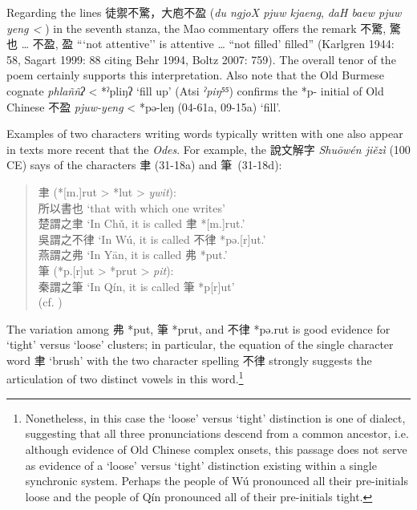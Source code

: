 Regarding the lines 徒禦不驚，大庖不盈 (\emph{du ngjoX pjuw kjaeng},
 \emph{daH baew pjuw yeng \textless{}} {}) in the seventh stanza, the Mao commentary offers the remark
不驚, 驚也 \ldots{} 不盈, 盈 ```not attentive'' is attentive \ldots{}
``not filled' filled'' (Karlgren 1944: 58, Sagart 1999: 88 citing Behr
1994, Boltz 2007: 759). The overall tenor of the poem certainly supports
this interpretation. Also note that the Old Burmese cognate 
{} \emph{phlaññʔ} \textless{} *ˀpliŋʔ `fill up' (Atsi  \emph{ˀpiŋ⁵⁵})
confirms the *p- initial of Old Chinese 不盈  \emph{pjuw-yeng}
\textless{} *pə-leŋ (04-61a, 09-15a) `fill'.

Examples of two characters writing words typically written with one also
appear in texts more recent that the \emph{Odes}. For example, the
說文解字 \emph{Shuōwén jiězì} (100 CE) says of the characters 聿
(31-18a) and 筆~(31-18d):

\begin{quote}
聿 (*[m.]rut \textgreater{} *lut \textgreater{} 
 \emph{ywit}):\\
所以書也 `that with which one writes'\\
楚謂之聿 `In Chǔ, it is called 聿 *[m.]rut.'\\
吳謂之不律 `In Wú, it is called 不律 *pə.{[}r]ut.'\\
燕謂之弗 `In Yān, it is called 弗 *put.'\\
筆 (*p.{[}r]ut \textgreater{} *prut \textgreater{} 
 \emph{pit}):\\
秦謂之筆 `In Qín, it is called 筆 *p{[}r]ut' \\ (cf. \cite[43]{Baxter2014OldChinese})
\end{quote}

The variation among 弗 *put, 筆 *prut, and 不律 *pə.rut is good evidence
for `tight' versus `loose' clusters; in particular, the equation of the
single character word 聿 `brush' with the two character spelling 不律
strongly suggests the articulation of two distinct vowels in this
word.\footnote{Nonetheless, in this case the `loose' versus `tight'
  distinction is one of dialect, suggesting that all three
  pronunciations descend from a common ancestor, i.e. although evidence
  of Old Chinese complex onsets, this passage does not serve as evidence
  of a `loose' versus `tight' distinction existing within a single
  synchronic system. Perhaps the people of Wú pronounced all their
  pre-initials loose and the people of Qín pronounced all of their
  pre-initials tight.}

